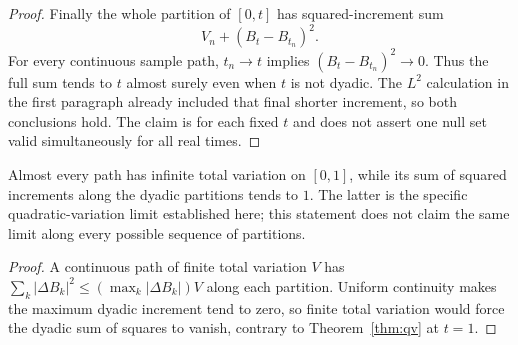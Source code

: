 \begin{proof}
Finally the whole partition of $[0,t]$ has squared-increment sum
\[
 V_n+(B_t-B_{t_n})^2.
\]
For every continuous sample path, $t_n\to t$ implies $(B_t-B_{t_n})^2\to0$. Thus the full sum tends to $t$ almost surely even when $t$ is not dyadic. The $L^2$ calculation in the first paragraph already included that final shorter increment, so both conclusions hold. The claim is for each fixed $t$ and does not assert one null set valid simultaneously for all real times.
\end{proof}

\begin{corollaryx}[variation]
Almost every path has infinite total variation on $[0,1]$, while its sum of squared increments along the dyadic partitions tends to $1$. The latter is the specific quadratic-variation limit established here; this statement does not claim the same limit along every possible sequence of partitions.
\end{corollaryx}
\begin{proof}
A continuous path of finite total variation $V$ has $\sum_k|\Delta B_k|^2\le(\max_k|\Delta B_k|)V$ along each partition. Uniform continuity makes the maximum dyadic increment tend to zero, so finite total variation would force the dyadic sum of squares to vanish, contrary to Theorem~\ref{thm:qv} at $t=1$.
\end{proof}

